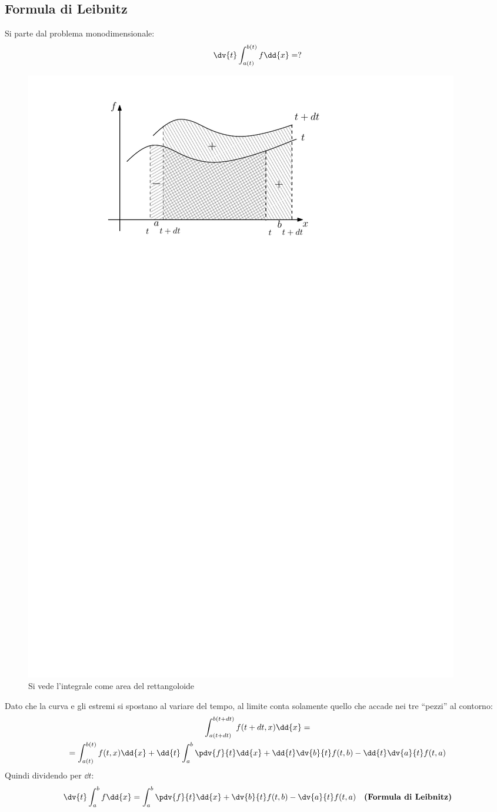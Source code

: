 \subsection*{Formula di Leibnitz}
Si parte dal problema monodimensionale:
	\begin{equation*}
		\dv{t} \int_{a(t)}^{b(t)} f \dd{x} = ?
	\end{equation*}
	\begin{figure}[H]
		\includegraphics[scale=0.6]{./Appendice B - Cassetta degli attrezzi/B.1}
		\centering
		\caption{Si vede l'integrale come area del rettangoloide}
	\end{figure}
Dato che la curva e gli estremi si spostano al variare del tempo, al limite conta solamente quello che accade nei tre ``pezzi'' al contorno:
	\begin{equation*}
		\begin{gathered}
			\int_{a(t+dt)}^{b(t+dt)} f(t+dt, x) \dd{x} = \\
			= \int_{a(t)}^{b(t)} f(t, x) \dd{x} + \dd{t} \int_a^b \pdv{f}{t} \dd{x} + \dd{t} \dv{b}{t} f(t, b) - \dd{t} \dv{a}{t} f(t,a) \\
		\end{gathered}
	\end{equation*}			
Quindi dividendo per $\dd{t}$:
	\begin{equation*}			
		\dv{t} \int_a^b f \dd{x} = \int_a^b \pdv{f}{t} \dd{x} + \dv{b}{t} f(t,b) - \dv{a}{t} f(t,a)  \quad \textbf{(Formula di Leibnitz)}
	\end{equation*}

